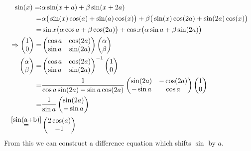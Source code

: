\documentclass[12pt]{article}
\begin{document}
\begin{align}
\sin(x) \eqqcolon& \alpha\sin(x+a) + \beta\sin(x+2a) \nonumber\\
=& \alpha\big(\sin(x)\cos(a) + \sin(a)\cos(x)\big) + \beta\big(\sin(x)\cos(2a) + \sin(2a)\cos(x)\big) \nonumber\\
=& \sin x\big( \alpha\cos a + \beta\cos(2a) \big) + \cos x\big( \alpha\sin a + \beta\sin(2a) \big) \\
\Rightarrow \begin{pmatrix} 1 \\ 0 \end{pmatrix} =& \begin{pmatrix} \cos a & \cos(2a) \\ \sin a & \sin(2a) \end{pmatrix} \begin{pmatrix} \alpha \\ \beta \end{pmatrix}\\
\begin{pmatrix} \alpha \\ \beta \end{pmatrix} =& \begin{pmatrix} \cos a & \cos(2a) \\ \sin a & \sin(2a) \end{pmatrix}^{-1} \begin{pmatrix} 1 \\ 0 \end{pmatrix} \nonumber\\
=& \frac 1{\cos a\sin(2a) - \sin a\cos(2a)} \begin{pmatrix} \sin(2a) & -\cos(2a) \\ -\sin a & \cos a \end{pmatrix} \begin{pmatrix} 1 \\ 0 \end{pmatrix} \nonumber\\
=& \frac 1{\sin a} \begin{pmatrix} \sin(2a) \\ -\sin a \end{pmatrix} \nonumber\\
\overset{\eqref{sin(a+b)}}=& \begin{pmatrix} 2\cos(a) \\ -1 \end{pmatrix} \nonumber
\end{align}
From this we can construct a difference equation which shifts $\sin$ by $a$. 
\end{document}
